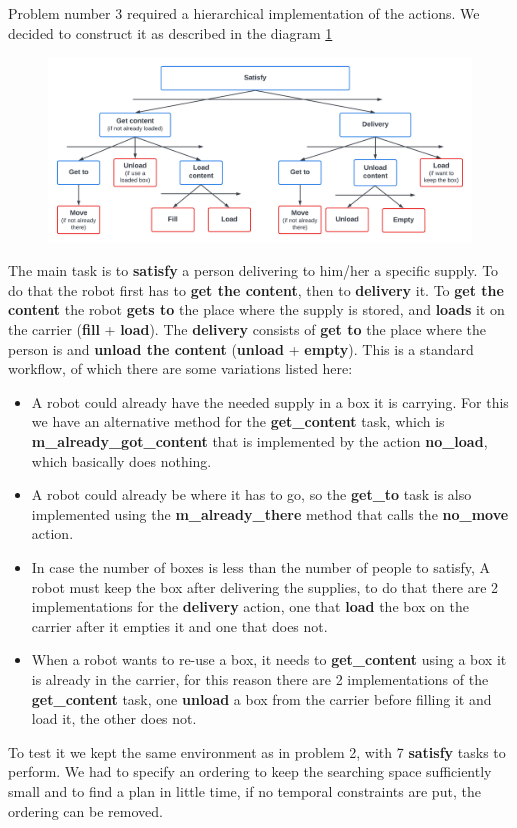 Problem number 3 required a hierarchical implementation of the actions.
We decided to construct it as described in the diagram \ref{Actions diagram}
\begin{figure}[h!]
    \includegraphics[scale = 0.35]{images/Actions_diagram.pdf}
    \label{Actions diagram}
\end{figure}
The main task is to \textbf{satisfy} a person delivering to him/her a specific supply.
To do that the robot first has to \textbf{get the content}, then to \textbf{delivery} it.
To \textbf{get the content} the robot \textbf{gets to} the place where the supply is stored, and \textbf{loads} it on the carrier (\textbf{fill} + \textbf{load}).
The \textbf{delivery} consists of \textbf{get to} the place where the person is and \textbf{unload the content} (\textbf{unload} + \textbf{empty}).
This is a standard workflow, of which there are some variations listed here:
\begin{itemize}
    \item A robot could already have the needed supply in a box it is carrying. For this we have an alternative method for the \textbf{get\_content} task, which is \textbf{m\_already\_got\_content} that is implemented by the action \textbf{no\_load}, which basically does nothing.
    \item A robot could already be where it has to go, so the \textbf{get\_to} task is also implemented using the \textbf{m\_already\_there} method that calls the \textbf{no\_move} action.
    \item In case the number of boxes is less than the number of people to satisfy, A robot must keep the box after delivering the supplies, to do that there are 2 implementations for the \textbf{delivery} action, one that \textbf{load} the box on the carrier after it empties it and one that does not.
    \item When a robot wants to re-use a box, it needs to \textbf{get\_content} using a box it is already in the carrier, for this reason there are 2 implementations of the \textbf{get\_content} task, one \textbf{unload} a box from the carrier before filling it and load it, the other does not.
\end{itemize} 
To test it we kept the same environment as in problem 2, with 7 \textbf{satisfy} tasks to perform.
We had to specify an ordering to keep the searching space sufficiently small and to find a plan in little time, if no temporal constraints are put, the ordering can be removed.